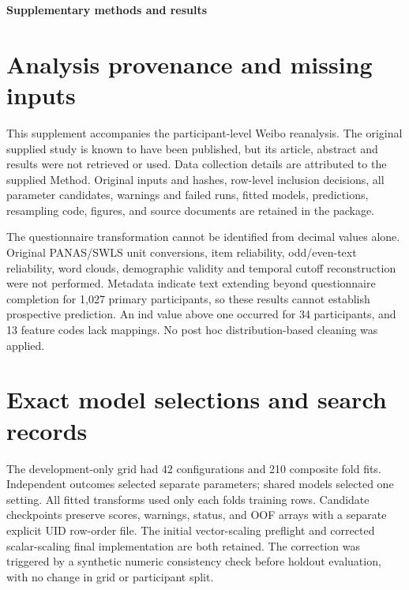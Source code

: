 \documentclass[11pt,letterpaper]{article}
\begin{document}
\begin{center}\fontsize{16}{20}\selectfont\bfseries Supplementary methods and results\end{center}
\section{Analysis provenance and missing inputs}\label{analysis-provenance-and-missing-inputs}

This supplement accompanies the participant-level Weibo reanalysis. The original supplied study is known to have been published, but its article, abstract and results were not retrieved or used. Data collection details are attributed to the supplied Method. Original inputs and hashes, row-level inclusion decisions, all parameter candidates, warnings and failed runs, fitted models, predictions, resampling code, figures, and source documents are retained in the package.

The questionnaire transformation cannot be identified from decimal values alone. Original PANAS/SWLS unit conversions, item reliability, odd/even-text reliability, word clouds, demographic validity and temporal cutoff reconstruction were not performed. Metadata indicate text extending beyond questionnaire completion for 1,027 primary participants, so these results cannot establish prospective prediction. An ind value above one occurred for 34 participants, and 13 feature codes lack mappings. No post hoc distribution-based cleaning was applied.

\section{Exact model selections and search records}\label{exact-model-selections-and-search-records}

The development-only grid had 42 configurations and 210 composite fold fits. Independent outcomes selected separate parameters; shared models selected one setting. All fitted transforms used only each fold\textquotesingle s training rows. Candidate checkpoints preserve scores, warnings, status, and OOF arrays with a separate explicit UID row-order file. The initial vector-scaling preflight and corrected scalar-scaling final implementation are both retained. The correction was triggered by a synthetic numeric consistency check before holdout evaluation, with no change in grid or participant split.

\begingroup\singlespacing\fontsize{10}{12}\selectfont\setlength{\parindent}{0pt}
\end{document}
